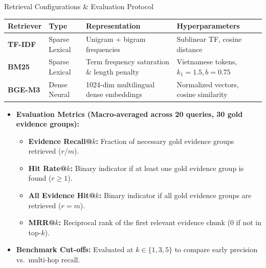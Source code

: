 \begin{frame}{Retrieval Configurations \& Evaluation Protocol}
  \vspace{-0.1cm}
  \begin{table}[H]
    \centering
    \footnotesize
    \renewcommand{\arraystretch}{1.2}
    \begin{tabularx}{\textwidth}{>{\bfseries}l l X l}
      \toprule
      \rowcolor{tableheader}
      Retriever & Type & Representation & Hyperparameters \\
      \midrule
      TF-IDF & Sparse Lexical & Unigram + bigram frequencies & Sublinear TF, cosine distance \\
      BM25 & Sparse Lexical & Term frequency saturation \& length penalty & Vietnamese tokens, $k_1=1.5, b=0.75$ \\
      BGE-M3 & Dense Neural & 1024-dim multilingual dense embeddings & Normalized vectors, cosine similarity \\
      \bottomrule
    \end{tabularx}
  \end{table}

  \vspace{0.1cm}
  \begin{itemize}
    \setlength{\itemsep}{0.2cm}
    \item \textbf{Evaluation Metrics (Macro-averaged across 20 queries, 30 gold evidence groups):}
      \begin{itemize}
        \item \textbf{Evidence Recall@$k$:} Fraction of necessary gold evidence groups retrieved ($r/m$).
        \item \textbf{Hit Rate@$k$:} Binary indicator if at least one gold evidence group is found ($r \ge 1$).
        \item \textbf{All Evidence Hit@$k$:} Binary indicator if all gold evidence groups are retrieved ($r = m$).
        \item \textbf{MRR@$k$:} Reciprocal rank of the first relevant evidence chunk (0 if not in top-$k$).
      \end{itemize}
    \item \textbf{Benchmark Cut-offs:} Evaluated at $k \in \{1, 3, 5\}$ to compare early precision vs.\ multi-hop recall.
  \end{itemize}

\end{frame}
